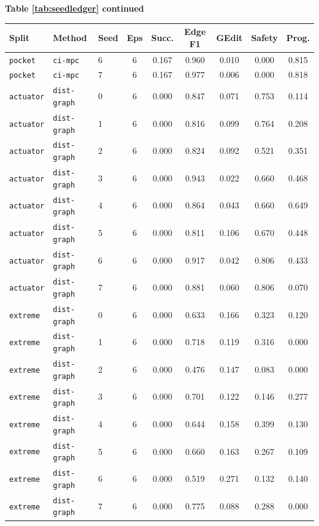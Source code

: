 \documentclass{article}
\begin{document}
\begin{center}
\textbf{Table \ref{tab:seedledger} continued}\\[0.4ex]
\begin{tabular}{lllcccccc}
\toprule
Split & Method & Seed & Eps & Succ. & Edge F1 & GEdit & Safety & Prog. \\
\midrule
\texttt{pocket} & \texttt{ci-mpc} & 6 & 6 & 0.167 & 0.960 & 0.010 & 0.000 & 0.815 \\
\texttt{pocket} & \texttt{ci-mpc} & 7 & 6 & 0.167 & 0.977 & 0.006 & 0.000 & 0.818 \\
\texttt{actuator} & \texttt{dist-graph} & 0 & 6 & 0.000 & 0.847 & 0.071 & 0.753 & 0.114 \\
\texttt{actuator} & \texttt{dist-graph} & 1 & 6 & 0.000 & 0.816 & 0.099 & 0.764 & 0.208 \\
\texttt{actuator} & \texttt{dist-graph} & 2 & 6 & 0.000 & 0.824 & 0.092 & 0.521 & 0.351 \\
\texttt{actuator} & \texttt{dist-graph} & 3 & 6 & 0.000 & 0.943 & 0.022 & 0.660 & 0.468 \\
\texttt{actuator} & \texttt{dist-graph} & 4 & 6 & 0.000 & 0.864 & 0.043 & 0.660 & 0.649 \\
\texttt{actuator} & \texttt{dist-graph} & 5 & 6 & 0.000 & 0.811 & 0.106 & 0.670 & 0.448 \\
\texttt{actuator} & \texttt{dist-graph} & 6 & 6 & 0.000 & 0.917 & 0.042 & 0.806 & 0.433 \\
\texttt{actuator} & \texttt{dist-graph} & 7 & 6 & 0.000 & 0.881 & 0.060 & 0.806 & 0.070 \\
\texttt{extreme} & \texttt{dist-graph} & 0 & 6 & 0.000 & 0.633 & 0.166 & 0.323 & 0.120 \\
\texttt{extreme} & \texttt{dist-graph} & 1 & 6 & 0.000 & 0.718 & 0.119 & 0.316 & 0.000 \\
\texttt{extreme} & \texttt{dist-graph} & 2 & 6 & 0.000 & 0.476 & 0.147 & 0.083 & 0.000 \\
\texttt{extreme} & \texttt{dist-graph} & 3 & 6 & 0.000 & 0.701 & 0.122 & 0.146 & 0.277 \\
\texttt{extreme} & \texttt{dist-graph} & 4 & 6 & 0.000 & 0.644 & 0.158 & 0.399 & 0.130 \\
\texttt{extreme} & \texttt{dist-graph} & 5 & 6 & 0.000 & 0.660 & 0.163 & 0.267 & 0.109 \\
\texttt{extreme} & \texttt{dist-graph} & 6 & 6 & 0.000 & 0.519 & 0.271 & 0.132 & 0.140 \\
\texttt{extreme} & \texttt{dist-graph} & 7 & 6 & 0.000 & 0.775 & 0.088 & 0.288 & 0.000 \\

\end{tabular}
\end{center}
\end{document}
